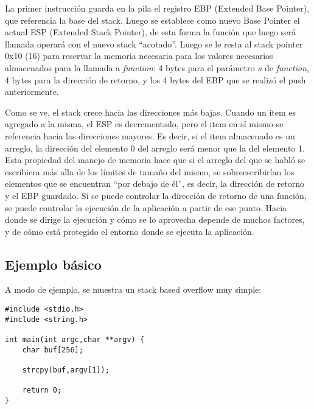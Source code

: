 	\vspace{5 mm}
	
La primer instrucci\'on guarda en la pila el registro EBP (Extended Base Pointer), que referencia la base del stack. Luego se establece como nuevo Base Pointer el actual ESP (Extended Stack Pointer), de esta forma la funci\'on que luego ser\'a llamada operar\'a con el nuevo stack ``acotado''. Luego se le resta al stack pointer 0x10 (16) para reservar la memoria necesaria para los valores necesarios almacenados para la llamada a {\em function}: 4 bytes para el par\'ametro {\em a} de {\em function}, 4 bytes para la direcci\'on de retorno, y los 4 bytes del EBP que se realiz\'o el push anteriormente.

Como se ve, el stack crece hacia las direcciones m\'as bajas. Cuando un item es agregado a la misma, el ESP es decrementado, pero el item en s\'i mismo se referencia hacia las direcciones mayores. Es decir, si el item almacenado es un arreglo, la direcci\'on del elemento 0 del arreglo ser\'a menor que la del elemento 1. Esta propiedad del manejo de memoria hace que si el arreglo del que se habl\'o se escribiera m\'as alla de los l\'imites de tama\~no del mismo, se sobreescribir\'ian los elementos que se encuentran ``por debajo de \'el'', es decir, la direcci\'on de retorno y el EBP guardado. Si se puede controlar la direcci\'on de retorno de una funci\'on, se puede controlar la ejecuci\'on de la aplicaci\'on a partir de ese punto. Hacia donde se dirige la ejecuci\'on y c\'omo se lo aprovecha depende de muchos factores, y de c\'omo est\'a protegido el entorno donde se ejecuta la aplicaci\'on.

\subsection{Ejemplo b\'asico}
	\label{sec:ejemplo_basico}
	
A modo de ejemplo, se muestra un stack based overflow muy simple:

	\vspace{5 mm}
	
\begin{lstlisting}
#include <stdio.h>
#include <string.h>

int main(int argc,char **argv) {
	char buf[256];

	strcpy(buf,argv[1]);
	
	return 0;
}
\end{lstlisting}

	\vspace{5 mm}
	
